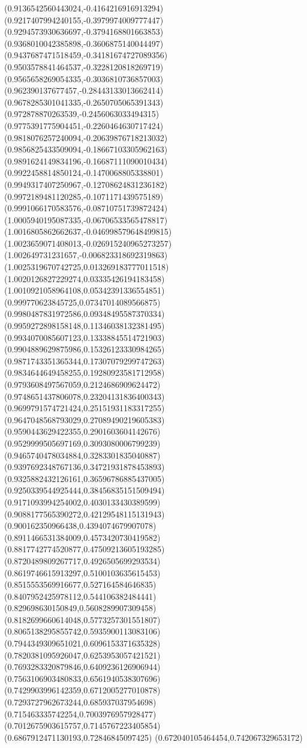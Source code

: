 {(0.9136542560443024,-0.4164216916913294)
(0.9217407994240155,-0.3979974009777447)
(0.9294573930636697,-0.3794168801663853)
(0.9368010042385898,-0.3606875140044497)
(0.9437687471518459,-0.34181674727089356)
(0.9503578841464537,-0.3228120818269719)
(0.9565658269054335,-0.3036810736857003)
(0.962390137677457,-0.28443133013662414)
(0.9678285301041335,-0.2650705065391343)
(0.972878870263539,-0.2456063033494315)
(0.9775391775904451,-0.2260464630717424)
(0.9818076257240094,-0.20639876718213032)
(0.9856825433509094,-0.18667103305962163)
(0.9891624149834196,-0.16687111090010434)
(0.9922458814850124,-0.1470068805338801)
(0.9949317407250967,-0.12708624831236182)
(0.9972189481120285,-0.1071171439575189)
(0.9991066170583576,-0.08710751739872424)
(1.0005940195087335,-0.06706533565478817)
(1.0016805862662637,-0.046998579648499815)
(1.0023659071408013,-0.026915240965273257)
(1.002649731231657,-0.006823318692319863)
(1.0025319670742725,0.013269183777011518)
(1.0020126827229274,0.03335426194183458)
(1.0010921058964108,0.05342391336554851)
(0.999770623845725,0.07347014089566875)
(0.9980487831972586,0.09348495587370334)
(0.9959272898158148,0.11346038132381495)
(0.9934070085607123,0.13338845514721903)
(0.9904889629875986,0.15326123330984265)
(0.9871743351365344,0.17307079299747263)
(0.9834644649458255,0.19280923581712958)
(0.9793608497567059,0.2124686909624472)
(0.9748651437806078,0.23204131836400343)
(0.9699791574721424,0.25151931183317255)
(0.9647048568793029,0.27089490219605383)
(0.9590443629422355,0.2901603604142676)
(0.9529999505697169,0.3093080006799239)
(0.9465740478034884,0.3283301835040887)
(0.9397692348767136,0.34721931878453893)
(0.9325882432126161,0.36596786885437005)
(0.9250339544925444,0.38456835151509494)
(0.9171093994254002,0.4030133430389599)
(0.9088177565390272,0.42129548115131943)
(0.900162350966438,0.4394074679907078)
(0.8911466531384009,0.4573420730419582)
(0.8817742774520877,0.47509213605193285)
(0.8720489809267717,0.4926505699293534)
(0.8619746615913297,0.5100103635615453)
(0.8515553569916677,0.527164584646835)
(0.8407952425978112,0.544106382484441)
(0.829698630150849,0.5608289907309458)
(0.8182699660614048,0.5773257301551807)
(0.8065138295855742,0.5935900113083106)
(0.7944349309651021,0.6096153371635328)
(0.7820381095926047,0.6253953057421521)
(0.7693283320879846,0.6409236126906944)
(0.7563106903480833,0.6561940538307696)
(0.7429903996142359,0.6712005277010878)
(0.7293727962673244,0.685937037954698)
(0.715463335742254,0.7003976957928477)
(0.7012675903615757,0.7145767223405854)
(0.6867912471130193,0.72846845097425)
(0.672040105464454,0.742067329653172)
}
